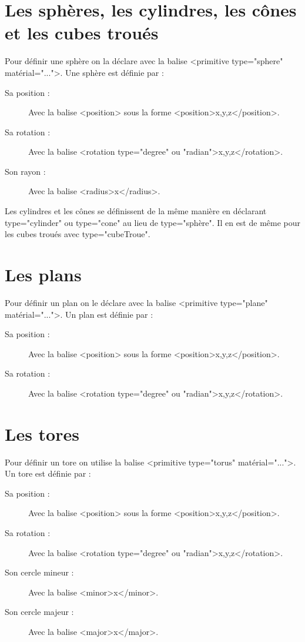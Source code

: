 \documentclass{report}
\begin{document}
\section{Les sph\`eres, les cylindres, les c\^ones et les cubes trou\'es}
Pour d\'efinir une sph\`ere on la d\'eclare avec la balise <primitive type="sphere" mat\'erial="...">.
\newline Une sph\`ere est d\'efinie par :
\begin{description}
 \item [Sa position :] Avec la balise <position> sous la forme <position>x,y,z</position>.
 \item [Sa rotation :] Avec la balise <rotation type="degree" ou "radian">x,y,z</rotation>.
 \item [Son rayon :] Avec la balise <radius>x</radius>.
\end{description}
Les cylindres et les c\^ones se d\'efinissent de la m\^eme mani\`ere en d\'eclarant type="cylinder" ou type="cone" au lieu de type="sph\`ere".
\newline Il en est de m\^eme pour les cubes trou\'es avec type="cubeTroue".
\section{Les plans}
Pour d\'efinir un plan on le d\'eclare avec la balise <primitive type="plane" mat\'erial="...">.
\newline Un plan est d\'efinie par :
\begin{description}
 \item [Sa position :] Avec la balise <position> sous la forme <position>x,y,z</position>.
 \item [Sa rotation :] Avec la balise <rotation type="degree" ou "radian">x,y,z</rotation>.
\end{description}
\section{Les tores}
Pour d\'efinir un tore on utilise la balise <primitive type="torus" mat\'erial="...">.
\newline Un tore est d\'efinie par :
\begin{description}
 \item [Sa position :] Avec la balise <position> sous la forme <position>x,y,z</position>.
 \item [Sa rotation :] Avec la balise <rotation type="degree" ou "radian">x,y,z</rotation>.
 \item [Son cercle mineur :] Avec la balise <minor>x</minor>.
 \item [Son cercle majeur :] Avec la balise <major>x</major>.
\end{description}
\end{document}
